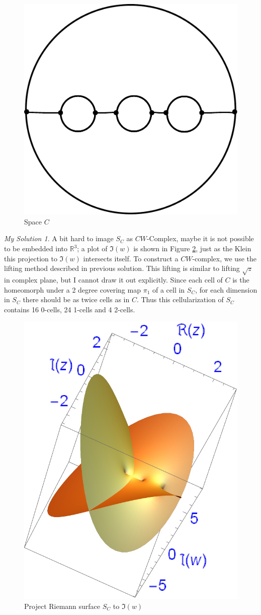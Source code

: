 \documentclass[]{article}
\theoremstyle{remark}
\newtheorem*{sol}{My Solution}
\begin{document}
\begin{figure}[htbp]
	\centering
	\includegraphics[width=0.6\linewidth]{"Covering space 3 hole"}
	\caption{Space $ C $}
	\label{fig:3hole}
\end{figure}
\begin{sol}
	A bit hard to image $ S_C $ as $ CW $-Complex, maybe it is not possible to be embedded into $ \mathbb{R}^3 $; a plot of $ \Im(w) $ is shown in Figure \ref{fig:riemann_plot}, just as the Klein this projection to $ \Im(w) $ intersects itself. To construct a $ CW $-complex, we use the lifting method described in previous solution. This lifting is similar to lifting $ \sqrt{z} $ in complex plane, but I cannot draw it out explicitly.
	 Since each cell of $C$ is the homeomorph under a 2 degree covering map $\pi_{1}$ of a cell in $S_C$, for each dimension in $S_C$ there should be as twice cells as in $ C $. Thus this cellularization of $S_C$ contains 16 0-cells, 24 1-cells and 4 2-cells.
\end{sol}
\begin{figure}[htbp]
	\centering
	\includegraphics[width=0.6\linewidth]{"riemann_plot_SC"}
	\caption{Project Riemann surface $ S_C $ to $ \Im(w) $}
	\label{fig:riemann_plot}
\end{figure}
\end{document}

